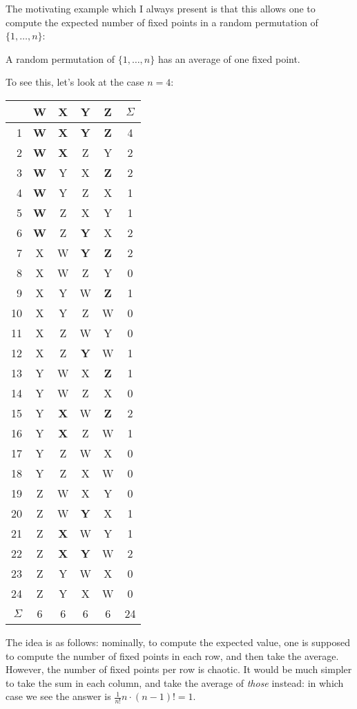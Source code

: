 \documentclass[11pt]{scrartcl}
\begin{document}
The motivating example which I always present is that this allows
one to compute the expected number of fixed points in a random
permutation of $\{1, \dots, n\}$:
\begin{example}
  A random permutation of $\{1, \dots, n\}$ has an average of one fixed point.
\end{example}
To see this, let's look at the case $n=4$:
\begin{center}
\begin{tabular}[h]{r|cccc|c}
  & W & X & Y & Z & $\Sigma$ \\ \hline\hline
1 & \textbf{\color{red} W} & \textbf{\color{red} X} & \textbf{\color{red} Y} & \textbf{\color{red} Z} & 4 \\
2 & \textbf{\color{red} W} & \textbf{\color{red} X} & Z & Y & 2 \\
3 & \textbf{\color{red} W} & Y & X & \textbf{\color{red} Z} & 2 \\
4 & \textbf{\color{red} W} & Y & Z & X & 1 \\
5 & \textbf{\color{red} W} & Z & X & Y & 1 \\
6 & \textbf{\color{red} W} & Z & \textbf{\color{red} Y} & X & 2 \\
7 & X & W & \textbf{\color{red} Y} & \textbf{\color{red} Z} & 2 \\
8 & X & W & Z & Y & 0 \\
9 & X & Y & W & \textbf{\color{red} Z} & 1 \\
10 & X & Y & Z & W & 0 \\
11 & X & Z & W & Y & 0 \\
12 & X & Z & \textbf{\color{red} Y} & W & 1 \\
13 & Y & W & X & \textbf{\color{red} Z} & 1 \\
14 & Y & W & Z & X & 0 \\
15 & Y & \textbf{\color{red} X} & W & \textbf{\color{red} Z} & 2 \\
16 & Y & \textbf{\color{red} X} & Z & W & 1 \\
17 & Y & Z & W & X & 0 \\
18 & Y & Z & X & W & 0 \\
19 & Z & W & X & Y & 0 \\
20 & Z & W & \textbf{\color{red} Y} & X & 1 \\
21 & Z & \textbf{\color{red} X} & W & Y & 1 \\
22 & Z & \textbf{\color{red} X} & \textbf{\color{red} Y} & W & 2 \\
23 & Z & Y & W & X & 0 \\
24 & Z & Y & X & W & 0 \\
\hline
$\Sigma$ & 6 & 6 & 6 & 6 & 24
\end{tabular}
\end{center}
The idea is as follows:
nominally, to compute the expected value, one is supposed
to compute the number of fixed points in each row,
and then take the average.
However, the number of fixed points per row is chaotic.
It would be much simpler to take the sum in each column,
and take the average of \emph{those} instead:
in which case we see the answer is $\frac{1}{n!} n \cdot (n-1)! = 1$.
\end{document}
